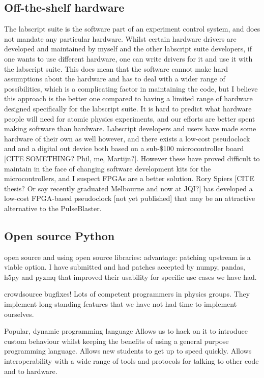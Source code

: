 \subsection{Off-the-shelf hardware}

The labscript suite is the software part of an experiment control system, and does not mandate any particular hardware. Whilst certain hardware drivers are developed and maintained by myself and the other labscript suite developers, if one wants to use different hardware, one can write drivers for it and use it with the labscript suite. This does mean that the software cannot make hard assumptions about the hardware and has to deal with a wider range of possibilities, which is a complicating factor in maintaining the code, but I believe this approach is the better one compared to having a limited range of hardware designed specifically for the labscript suite. It is hard to predict what hardware people will need for atomic physics experiments, and our efforts are better spent making software than hardware. Labscript developers and users have made some hardware of their own as well however, and there exists a low-cost pseudoclock and and a digital out device both based on a sub-\$100 microcontroller board [CITE SOMETHING? Phil, me, Martijn?]. However these have proved difficult to maintain in the face of changing software development kits for the microcontrollers, and I suspect FPGAs are a better solution. Rory Spiers [CITE thesis? Or say recently graduated Melbourne and now at JQI?] has developed a low-cost FPGA-based pseudoclock [not yet published] that may be an attractive alternative to the PulseBlaster.

\subsection{Open source Python}



open source and using open source libraries: advantage: patching upstream is a viable option. I have submitted and had patches accepted by numpy, pandas, h5py and pyzmq that improved their usability for specific use cases we have had. 

crowdsource bugfixes! Lots of competent programmers in physics groups. They implement long-standing features
that we have not had time to implement ourselves.

Popular, dynamic programming language
Allows us to hack on it to introduce custom behaviour whilst keeping the benefits of using a general purpose programming language. Allows new students to get up to speed quickly. Allows interoperability with a wide range of tools and protocols for talking to other code and to hardware.

